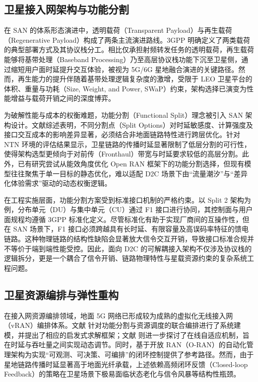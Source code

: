 \documentclass[type=master]{fduthesis}
\begin{document}
\subsection{卫星接入网架构与功能分割}
在 SAN 的体系形态演进中，透明载荷（Transparent Payload）与再生载荷（Regenerative Payload）构成了两条主流演进路线。3GPP 明确定义了两类载荷的典型部署方式及其协议栈分工\cite{3gpp.23.737,3gpp.38.801}。相比仅承担射频转发任务的透明载荷，再生载荷能够将基带处理（Baseband Processing）乃至高层协议栈功能下沉至卫星侧，通过缩短用户面时延提升交互体验，被视为 5G/6G 星地融合演进的关键路径\cite{3gpp.38.821,9722775}。然而，再生能力的提升伴随着基带处理逻辑复杂度的激增，受限于 LEO 卫星平台的体积、重量与功耗（Size, Weight, and Power, SWaP）约束，架构选择已演变为性能增益与载荷开销之间的深度博弈\cite{9970355}。

为破解性能与成本的权衡难题，功能分割（Functional Split）理念被引入 SAN 架构设计。文献综述表明，不同分割点（Split Options）对时延敏感度、计算强度及接口交互成本的影响差异显著，必须结合非地面链路特性进行跨层优化\cite{larsen2018survey}。针对 NTN 环境的评估结果显示，卫星链路的传播时延显著限制了低层分割的可行性，使得架构选型更倾向于对前传（Fronthaul）带宽与时延要求较低的高层分割\cite{10572042,campana2023ran}。此外，已有研究尝试从能效角度优化 Open RAN 框架下的功能分割选择，但现有模型往往聚焦于单一目标的静态优化，难以适配 D2C 场景下由“流量潮汐”与“差异化体验需求”驱动的动态权衡逻辑\cite{10901285}。

在工程实施层面，功能分割方案受到标准接口机制的严格约束。以 Split 2 架构为例，分布单元（DU）与集中单元（CU）通过 F1 接口进行协同，其控制面与用户面规程均遵循 3GPP 标准化定义\cite{3gpp.38.470,3gpp.38.475}。尽管标准化有助于实现厂商间的互操作性，但在 SAN 场景下，F1 接口必须跨越具有长时延、有限容量及高误码率特征的馈电链路。这种物理链路的结构性缺陷会显著放大信令交互开销，导致接口标准合规并不等价于端到端性能受控\cite{campana2023ran,10572042}。因此，面向 D2C 的可解耦接入架构不仅涉及协议栈的逻辑拆分，更是一个耦合了信令开销、链路物理特性与星载资源约束的复杂系统工程问题\cite{3gpp.38.821,9970355}。

\subsection{卫星资源编排与弹性重构}
在接入网资源编排领域，地面 5G 网络已形成较为成熟的虚拟化无线接入网（vRAN）编排体系。文献\cite{9107209} 针对功能分割与资源调度的联合编排进行了系统建模，并提出了相应的启发式求解框架；文献\cite{9781611} 则进一步探讨了在线自适应机制，旨在时延与吞吐量之间实现动态调节。同时，基于开放 RAN（O-RAN）的自动化管理架构为实现“可观测、可决策、可编排”的闭环控制提供了参考路径\cite{d2022orchestran}。然而，由于星地链路传播时延显著高于地面光纤承载，上述依赖高频闭环反馈（Closed-loop Feedback）的策略在卫星场景下极易面临状态老化与信令风暴等结构性瓶颈\cite{3gpp.38.821,campana2023ran}。
\end{document}
